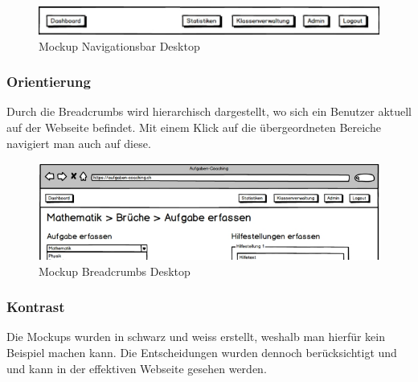 \begin{minipage}{\textwidth}
	\begin{figure}[H]
	\centering
		\includegraphics[width=\textwidth, keepaspectratio]{images/Mockups/Navigationsleiste_Desktop.png}
		\caption{Mockup Navigationsbar Desktop}
	\end{figure}
\end{minipage}


\subsubsection*{Orientierung} 
Durch die Breadcrumbs wird hierarchisch dargestellt, wo sich ein Benutzer aktuell auf der Webseite befindet. Mit einem Klick auf die übergeordneten Bereiche navigiert man auch auf diese. \\

\begin{minipage}{\textwidth}
	\begin{figure}[H]
	\centering
		\includegraphics[width=\textwidth, keepaspectratio]{images/Mockups/Breadcrumbs_Desktop.png}
		\caption{Mockup Breadcrumbs Desktop}
	\end{figure}
\end{minipage}


\subsubsection*{Kontrast}
Die Mockups wurden in schwarz und weiss erstellt, weshalb man hierfür kein Beispiel machen kann. Die Entscheidungen wurden dennoch berücksichtigt und  und kann in der effektiven Webseite gesehen werden.


\newpage